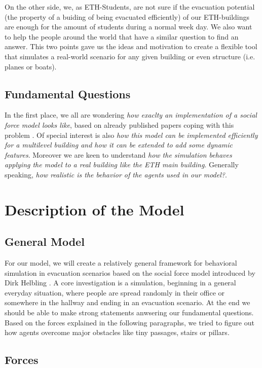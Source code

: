 \documentclass[11pt]{article}
\begin{document}
On the other side, we, as ETH-Students, are not sure if the evacuation potential
(the property of a buiding of being evacuated efficiently) of our ETH-buildings
are enough for the amount of students during a normal week day. We also want to
help the people around the world that have a similar question to find an answer.
This two points gave us the ideas and motivation to create a flexible tool that
simulates a real-world scenario for any given building or even structure (i.e.
planes or boats).


\subsection{Fundamental Questions}

In the first place, we all are wondering \textit{how exaclty an implementation
of a social force model looks like}, based on already published papers coping
with this problem \cite{SFMPD} \cite{SDFEP}. Of special interest is also
\textit{how this model can be implemented efficiently for a multilevel building
and how it can be extended to add some dynamic features}. Moreover we are keen
to understand \textit{how the simulation behaves applying the model to a real
building like the ETH main building}. Generally speaking, \textit{how realistic
is the behavior of the agents used in our model?}.

\section{Description of the Model}
\subsection{General Model}

For our model, we will create a relatively general framework for behavioral
simulation in evacuation scenarios based on the social force model introduced by Dirk Helbling \cite{SDFEP}.
A core investigation is a simulation, beginning in a general everyday situation,
where people are spread randomly in their office or somewhere in the hallway and ending in an evacuation scenario.
At the end we should be able to make strong
statements anwsering our fundamental questions.
Based on the forces explained in the following paragraphs, we tried to figure
out how agents overcome major obstacles like tiny passages, stairs or pillars.

\subsection {Forces}
\end{document}
